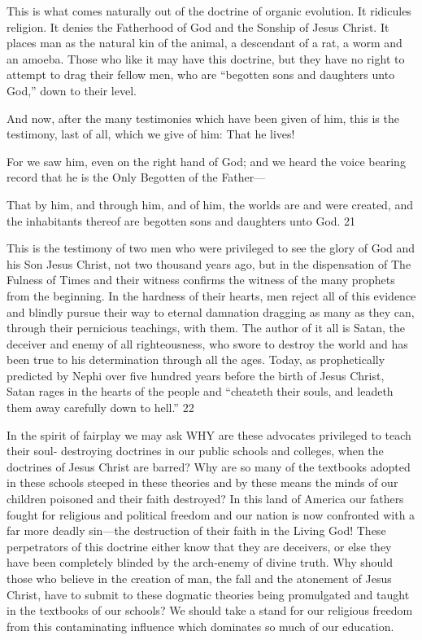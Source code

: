 This is what comes naturally out of the doctrine of organic evolution. It ridicules religion. It
denies the Fatherhood of God and the Sonship of Jesus Christ. It places man as the natural
kin of the animal, a descendant of a rat, a worm and an amoeba. Those who like it may have
this doctrine, but they have no right to attempt to drag their fellow men, who are ``begotten
sons and daughters unto God,'' down to their level.

And now, after the many testimonies which have been given of him, this is the testimony,
last of all, which we give of him: That he lives!

For we saw him, even on the right hand of God; and we heard the voice bearing record that
he is the Only Begotten of the Father—

That by him, and through him, and of him, the worlds are and were created, and the
inhabitants thereof are begotten sons and daughters unto God. 21

This is the testimony of two men who were privileged to see the glory of God and his Son
Jesus Christ, not two thousand years ago, but in the dispensation of The Fulness of Times and
their witness confirms the witness of the many prophets from the beginning. In the hardness
of their hearts, men reject all of this evidence and blindly pursue their way to eternal
damnation dragging as many as they can, through their pernicious teachings, with them. The
author of it all is Satan, the deceiver and enemy of all righteousness, who swore to destroy
the world and has been true to his determination through all the ages. Today, as prophetically
predicted by Nephi over five hundred years before the birth of Jesus Christ, Satan rages in
the hearts of the people and ``cheateth their souls, and leadeth them away carefully down to
hell.'' 22

In the spirit of fairplay we may ask WHY are these advocates privileged to teach their soul-
destroying doctrines in our public schools and colleges, when the doctrines of Jesus Christ
are barred? Why are so many of the textbooks adopted in these schools steeped in these
theories and by these means the minds of our children poisoned and their faith destroyed? In
this land of America our fathers fought for religious and political freedom and our nation is
now confronted with a far more deadly sin—the destruction of their faith in the Living God!
These perpetrators of this doctrine either know that they are deceivers, or else they have been
completely blinded by the arch-enemy of divine truth. Why should those who believe in the
creation of man, the fall and the atonement of Jesus Christ, have to submit to these dogmatic
theories being promulgated and taught in the textbooks of our schools? We should take a
stand for our religious freedom from this contaminating influence which dominates so much
of our education.

